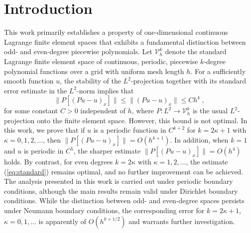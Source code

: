 \documentclass{amsart}
\begin{document}
\maketitle

\section{Introduction}\label{sec:intro}

This work primarily establishes a property of one-dimensional continuous Lagrange finite element spaces that exhibits a fundamental distinction between odd- and even-degree piecewise polynomials. Let $\mathcal{V}_h^k$ denote the standard Lagrange finite element space of continuous, periodic, piecewise $k$-degree polynomial functions over a grid with uniform mesh length $h$. For a sufficiently smooth function $u$, the stability of the $L^2$-projection together with its standard error estimate in the $L^2$-norm implies that
%
\begin{equation}\label{eq:standard}
\|P[(Pu-u)_x]\|\leq \|(Pu-u)_x\|\leq Ch^k\ ,
\end{equation}
%
for some constant $C > 0$ independent of $h$, where $P: L^2 \to \mathcal{V}_h^k$ is the usual $L^2$-projection onto the finite element space.
%
However, this bound is not optimal. In this work, we prove that if $u$ is a periodic function in $C^{k+2}$ for $k=2\kappa+1$ with $\kappa=0,1,2,\dots$, then $\|P[(Pu-u)_x]\|=O(h^{k+1})$.  In addition, when $k=1$ and $u$ is periodic in $C^{5}$, the sharper estimate $\|P[(Pu-u)_x]\| = O(h^{4})$ holds. By contrast, for even degrees $k=2\kappa$ with $\kappa=1,2,\dots$, the estimate (\ref{eq:standard}) remains optimal, and no further improvement can be achieved.
%
The analysis presented in this work is carried out under periodic boundary conditions, although the main results remain valid under Dirichlet boundary conditions. While the distinction between odd- and even-degree spaces persists under Neumann boundary conditions, the corresponding error for $k=2\kappa+1$, $\kappa=0,1,\dots$ is apparently of $O(h^{k+1/2})$ and warrants further investigation.
\end{document}
